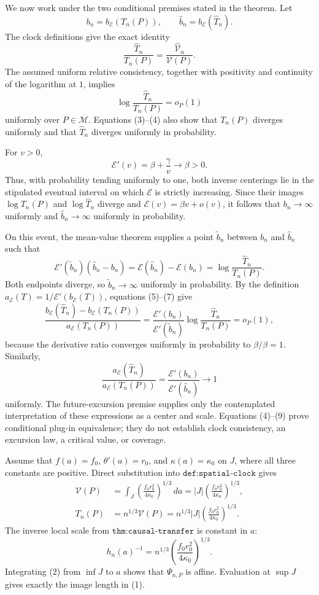 We now work under the two conditional premises stated in the theorem.  Let
\[
 b_n=b_{\mathcal E}(T_n(P)),
 \qquad
 \widehat b_n=b_{\mathcal E}(\widehat T_n).
\]
The clock definitions give the exact identity
\[
 \frac{\widehat T_n}{T_n(P)}
 =\frac{\widehat{\mathcal V}_n}{\mathcal V(P)}. \tag{4}
\]
The assumed uniform relative consistency, together with positivity and continuity of the logarithm at \(1\), implies
\[
 \log\frac{\widehat T_n}{T_n(P)}=o_P(1) \tag{5}
\]
uniformly over \(P\in\mathcal M\).  Equations (3)--(4) also show that \(T_n(P)\) diverges uniformly and that \(\widehat T_n\) diverges uniformly in probability.

For \(v>0\),
\[
 \mathcal E'(v)=\beta+\frac{\gamma}{v}\longrightarrow\beta>0. \tag{6}
\]
Thus, with probability tending uniformly to one, both inverse centerings lie in the stipulated eventual interval on which \(\mathcal E\) is strictly increasing.  Since their images \(\log T_n(P)\) and \(\log\widehat T_n\) diverge and \(\mathcal E(v)=\beta v+o(v)\), it follows that \(b_n\to\infty\) uniformly and \(\widehat b_n\to\infty\) uniformly in probability.

On this event, the mean-value theorem supplies a point \(\widetilde b_n\) between \(b_n\) and \(\widehat b_n\) such that
\[
 \mathcal E'(\widetilde b_n)(\widehat b_n-b_n)
 =\mathcal E(\widehat b_n)-\mathcal E(b_n)
 =\log\frac{\widehat T_n}{T_n(P)}. \tag{7}
\]
Both endpoints diverge, so \(\widetilde b_n\to\infty\) uniformly in probability.  By the definition
\(
 a_{\mathcal E}(T)=1/\mathcal E'(b_{\mathcal E}(T))
\), equations (5)--(7) give
\[
 \frac{b_{\mathcal E}(\widehat T_n)-b_{\mathcal E}(T_n(P))}
 {a_{\mathcal E}(T_n(P))}
 =\frac{\mathcal E'(b_n)}{\mathcal E'(\widetilde b_n)}
 \log\frac{\widehat T_n}{T_n(P)}
 =o_P(1), \tag{8}
\]
because the derivative ratio converges uniformly in probability to \(\beta/\beta=1\).  Similarly,
\[
 \frac{a_{\mathcal E}(\widehat T_n)}{a_{\mathcal E}(T_n(P))}
 =\frac{\mathcal E'(b_n)}{\mathcal E'(\widehat b_n)}
 \longrightarrow1 \tag{9}
\]
uniformly.  The future-excursion premise supplies only the contemplated interpretation of these expressions as a center and scale.  Equations (4)--(9) prove conditional plug-in equivalence; they do not establish clock consistency, an excursion law, a critical value, or coverage.

Assume that \(f(a)=f_0\), \(\theta'(a)=r_0\), and \(\kappa(a)=\kappa_0\) on \(J\), where all three constants are positive.  Direct substitution into \(\texttt{def:spatial-clock}\) gives
\[
 \begin{aligned}
 \mathcal V(P)
 &=\int_J\left(\frac{f_0r_0^2}{4\kappa_0}\right)^{1/3}\,da
 =|J|\left(\frac{f_0r_0^2}{4\kappa_0}\right)^{1/3},\\
 T_n(P)
 &=n^{1/3}\mathcal V(P)
 =n^{1/3}|J|\left(\frac{f_0r_0^2}{4\kappa_0}\right)^{1/3}.
 \end{aligned} \tag{1}
\]
The inverse local scale from \(\texttt{thm:causal-transfer}\) is constant in \(a\):
\[
 h_n(a)^{-1}=n^{1/3}
 \left(\frac{f_0r_0^2}{4\kappa_0}\right)^{1/3}. \tag{2}
\]
Integrating (2) from \(\inf J\) to \(a\) shows that \(\Psi_{n,P}\) is affine.  Evaluation at \(\sup J\) gives exactly the image length in (1).


